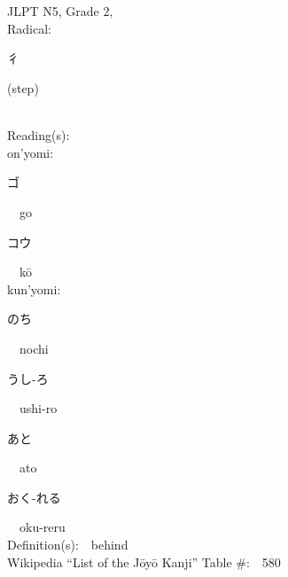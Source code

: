 \begin{multicols}{2}
\ \ \\
{\fontsize{34pt}{40pt}  }\ \ \\  %
{JLPT N5, Grade 2, \\Radical:\ \ {\begin{CJK}{UTF8}{min} 彳 \end{CJK}} (step) } \\
Reading(s):\ \ \\
{\hspace*{1em}}on'yomi:\ \ \\
{\hspace*{2em}}{\begin{CJK}{UTF8}{min} ゴ \end{CJK}}\ \ go\ \ \\
{\hspace*{2em}}{\begin{CJK}{UTF8}{min} コウ \end{CJK}}\ \ k\=o\ \ \\
{\hspace*{1em}}kun'yomi:\ \ \\
{\hspace*{2em}}{\begin{CJK}{UTF8}{min} のち \end{CJK}}\ \ nochi\ \ \\
{\hspace*{2em}}{\begin{CJK}{UTF8}{min} うし-ろ \end{CJK}}\ \ ushi-ro\ \ \\
{\hspace*{2em}}{\begin{CJK}{UTF8}{min} あと \end{CJK}}\ \ ato\ \ \\
{\hspace*{2em}}{\begin{CJK}{UTF8}{min} おく-れる \end{CJK}}\ \ oku-reru\ \ \\
Definition(s):\ \ behind \\
Wikipedia ``List of the J\=oy\=o Kanji'' Table \#:\ \ 580 \\
\ \ \\
{\fontsize{34pt}{40pt}  }\ \ \\  %

\end{multicols}

